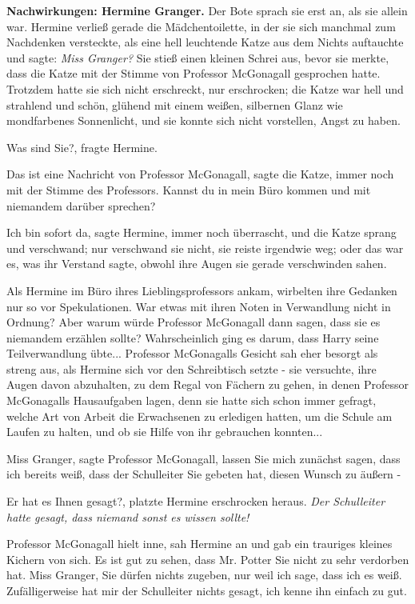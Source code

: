\textbf{Nachwirkungen: Hermine Granger.}
Der Bote sprach sie erst an, als sie allein war. Hermine verließ gerade die
Mädchentoilette, in der sie sich manchmal zum Nachdenken versteckte, als eine
hell leuchtende Katze aus dem Nichts auftauchte und sagte: \glqq{}\emph{Miss
Granger?}\grqq{} Sie stieß einen kleinen Schrei aus, bevor sie merkte, dass die
Katze mit der Stimme von Professor McGonagall gesprochen hatte. Trotzdem hatte
sie sich nicht erschreckt, nur erschrocken; die Katze war hell und strahlend und
schön, glühend mit einem weißen, silbernen Glanz wie mondfarbenes Sonnenlicht,
und sie konnte sich nicht vorstellen, Angst zu haben.

\glqq{}Was sind Sie?\grqq{}, fragte Hermine.

\glqq{}Das ist eine Nachricht von Professor McGonagall\grqq{}, sagte die Katze,
immer noch mit der Stimme des Professors. \glqq{}Kannst du in mein Büro kommen
und mit niemandem darüber sprechen?\grqq{}

\glqq{}Ich bin sofort da\grqq{}, sagte Hermine, immer noch überrascht, und die
Katze sprang und verschwand; nur verschwand sie nicht, sie reiste irgendwie weg;
oder das war es, was ihr Verstand sagte, obwohl ihre Augen sie gerade
verschwinden sahen.

Als Hermine im Büro ihres Lieblingsprofessors ankam, wirbelten ihre Gedanken nur
so vor Spekulationen. War etwas mit ihren Noten in Verwandlung nicht in Ordnung?
Aber warum würde Professor McGonagall dann sagen, dass sie es niemandem erzählen
sollte? Wahrscheinlich ging es darum, dass Harry seine Teilverwandlung übte...
Professor McGonagalls Gesicht sah eher besorgt als streng aus, als Hermine sich
vor den Schreibtisch setzte - sie versuchte, ihre Augen davon abzuhalten, zu dem
Regal von Fächern zu gehen, in denen Professor McGonagalls Hausaufgaben lagen,
denn sie hatte sich schon immer gefragt, welche Art von Arbeit die Erwachsenen
zu erledigen hatten, um die Schule am Laufen zu halten, und ob sie Hilfe von ihr
gebrauchen konnten...

\glqq{}Miss Granger\grqq{}, sagte Professor McGonagall, \glqq{}lassen Sie mich
zunächst sagen, dass ich bereits weiß, dass der Schulleiter Sie gebeten hat,
diesen Wunsch zu äußern -\grqq{}

\glqq{}Er hat es Ihnen gesagt?\grqq{}, platzte Hermine erschrocken heraus.
\emph{Der Schulleiter hatte gesagt, dass niemand sonst es wissen sollte!}

Professor McGonagall hielt inne, sah Hermine an und gab ein trauriges kleines
Kichern von sich. \glqq{}Es ist gut zu sehen, dass Mr. Potter Sie nicht zu sehr
verdorben hat. Miss Granger, Sie dürfen nichts zugeben, nur weil ich sage, dass
ich es weiß. Zufälligerweise hat mir der Schulleiter nichts gesagt, ich kenne
ihn einfach zu gut.\grqq{}

